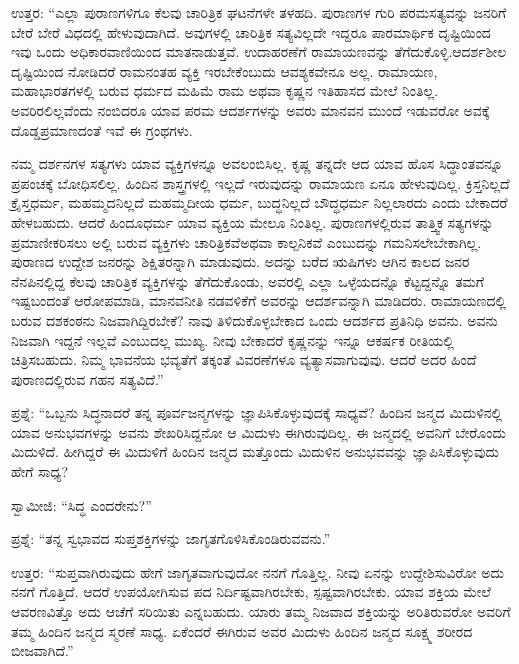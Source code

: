 ಉತ್ತರ: “ಎಲ್ಲಾ ಪುರಾಣಗಳಿಗೂ ಕೆಲವು ಚಾರಿತ್ರಿಕ ಘಟನೆಗಳೇ ತಳಹದಿ. ಪುರಾಣಗಳ ಗುರಿ ಪರಮಸತ್ಯವನ್ನು ಜನರಿಗೆ ಬೇರೆ ಬೇರೆ ವಿಧದಲ್ಲಿ ಹೇಳುವುದಾಗಿದೆ. ಅವುಗಳಲ್ಲಿ ಚಾರಿತ್ರಿಕ ಸತ್ಯವಿಲ್ಲದೇ ಇದ್ದರೂ ಪಾರಮಾರ್ಥಿಕ ದೃಷ್ಟಿಯಿಂದ ಇವು ಒಂದು ಅಧಿಕಾರ\-ವಾಣಿಯಿಂದ ಮಾತನಾಡುತ್ತವೆ. ಉದಾಹರಣೆಗೆ ರಾಮಾಯಣವನ್ನು ತೆಗೆದುಕೊಳ್ಳಿ.\break ಆದರ್ಶಶೀಲ ದೃಷ್ಟಿಯಿಂದ ನೋಡಿದರೆ ರಾಮನಂತಹ ವ್ಯಕ್ತಿ ಇರಬೇಕೆಂಬುದು ಆವಶ್ಯಕವೇನೂ ಅಲ್ಲ. ರಾಮಾಯಣ, ಮಹಾಭಾರತಗಳಲ್ಲಿ ಬರುವ ಧರ್ಮದ ಮಹಿಮೆ ರಾಮ ಅಥವಾ ಕೃಷ್ಣನ ಇತಿಹಾಸದ ಮೇಲೆ ನಿಂತಿಲ್ಲ. ಅವರಿರಲಿಲ್ಲವೆಂದು ನಂಬಿದರೂ ಯಾವ ಪರಮ ಆದರ್ಶಗಳನ್ನು ಅವರು ಮಾನವನ ಮುಂದೆ ಇಡುವರೋ ಅವಕ್ಕೆ ದೊಡ್ಡ\break ಪ್ರಮಾಣದಂತೆ ಇವೆ ಈ ಗ್ರಂಥಗಳು.

ನಮ್ಮ ದರ್ಶನಗಳ ಸತ್ಯಗಳು ಯಾವ ವ್ಯಕ್ತಿಗಳನ್ನೂ ಅವಲಂಬಿಸಿಲ್ಲ. ಕೃಷ್ಣ ತನ್ನದೇ ಆದ ಯಾವ ಹೊಸ ಸಿದ್ಧಾಂತವನ್ನೂ ಪ್ರಪಂಚಕ್ಕೆ ಬೋಧಿಸಲಿಲ್ಲ. ಹಿಂದಿನ ಶಾಸ್ತ್ರಗಳಲ್ಲಿ ಇಲ್ಲದೆ ಇರುವುದನ್ನು ರಾಮಾಯಣ ಏನೂ ಹೇಳುವುದಿಲ್ಲ. ಕ್ರಿಸ್ತನಿಲ್ಲದೆ ಕ್ರೈಸ್ತಧರ್ಮ, ಮಹಮ್ಮದನಿಲ್ಲದೆ ಮಹಮ್ಮದೀಯ ಧರ್ಮ, ಬುದ್ಧನಿಲ್ಲದೆ ಬೌದ್ಧಧರ್ಮ ನಿಲ್ಲಲಾರದು ಎಂದು ಬೇಕಾದರೆ ಹೇಳಬಹುದು. ಆದರೆ ಹಿಂದೂಧರ್ಮ ಯಾವ ವ್ಯಕ್ತಿಯ ಮೇಲೂ ನಿಂತಿಲ್ಲ. ಪುರಾಣಗಳಲ್ಲಿರುವ ತಾತ್ತ್ವಿಕ ಸತ್ಯಗಳನ್ನು ಪ್ರಮಾಣೀಕರಿಸಲು ಅಲ್ಲಿ ಬರುವ ವ್ಯಕ್ತಿಗಳು ಚಾರಿತ್ರಿಕವೆ\break ಅಥವಾ ಕಾಲ್ಪನಿಕವೆ ಎಂಬುದನ್ನು ಗಮನಿಸಲೇಬೇಕಾಗಿಲ್ಲ. ಪುರಾಣದ ಉದ್ದೇಶ ಜನರನ್ನು ಶಿಕ್ಷಿತರನ್ನಾಗಿ ಮಾಡುವುದು. ಅದನ್ನು ಬರೆದ ಋಷಿಗಳು ಆಗಿನ ಕಾಲದ ಜನರ ನೆನಪಿನಲ್ಲಿದ್ದ ಕೆಲವು ಚಾರಿತ್ರಿಕ ವ್ಯಕ್ತಿಗಳನ್ನು ತೆಗೆದುಕೊಂಡು, ಅವರಲ್ಲಿ ಎಲ್ಲಾ ಒಳ್ಳೆಯದನ್ನೊ ಕೆಟ್ಟದ್ದನ್ನೊ ತಮಗೆ ಇಷ್ಟಬಂದಂತೆ ಆರೋಪಮಾಡಿ, ಮಾನವನೀತಿ ನಡವಳಿಕೆಗೆ ಅವರನ್ನು ಆದರ್ಶವನ್ನಾಗಿ ಮಾಡಿದರು. ರಾಮಾಯಣದಲ್ಲಿ ಬರುವ ದಶಕಂಠನು ನಿಜವಾಗಿದ್ದಿರಬೇಕೆ? ನಾವು ತಿಳಿದುಕೊಳ್ಳಬೇಕಾದ ಒಂದು ಆದರ್ಶದ ಪ್ರತಿನಿಧಿ ಅವನು. ಅವನು ನಿಜವಾಗಿ ಇದ್ದನೆ ಇಲ್ಲವೆ ಎಂಬುದಲ್ಲ ಮುಖ್ಯ. ನೀವು ಬೇಕಾದರೆ ಕೃಷ್ಣನನ್ನು ಇನ್ನೂ ಆಕರ್ಷಕ ರೀತಿಯಲ್ಲಿ ಚಿತ್ರಿಸಬಹುದು. ನಿಮ್ಮ ಭಾವನೆಯ ಭವ್ಯತೆಗೆ ತಕ್ಕಂತೆ ವಿವರಣೆಗಳೂ ವ್ಯತ್ಯಾಸವಾಗುವುವು. ಆದರೆ ಅದರ ಹಿಂದೆ ಪುರಾಣದಲ್ಲಿರುವ ಗಹನ ಸತ್ಯವಿದೆ.”

ಪ್ರಶ್ನೆ: “ಒಬ್ಬನು ಸಿದ್ಧನಾದರೆ ತನ್ನ ಪೂರ್ವಜನ್ಮಗಳನ್ನು ಜ್ಞಾಪಿಸಿಕೊಳ್ಳುವುದಕ್ಕೆ ಸಾಧ್ಯವೆ? ಹಿಂದಿನ ಜನ್ಮದ ಮಿದುಳಿನಲ್ಲಿ ಯಾವ ಅನುಭವಗಳನ್ನು ಅವನು ಶೇಖರಿಸಿದ್ದನೋ ಆ ಮಿದುಳು ಈಗಿರುವುದಿಲ್ಲ. ಈ ಜನ್ಮದಲ್ಲಿ ಅವನಿಗೆ ಬೇರೊಂದು ಮಿದುಳಿದೆ. ಹೀಗಿದ್ದರೆ ಈ ಮಿದುಳಿಗೆ ಹಿಂದಿನ ಜನ್ಮದ ಮತ್ತೊಂದು ಮಿದುಳಿನ ಅನುಭವವನ್ನು ಜ್ಞಾಪಿಸಿಕೊಳ್ಳುವುದು ಹೇಗೆ ಸಾಧ್ಯ?

ಸ್ವಾಮೀಜಿ: “ಸಿದ್ಧ ಎಂದರೇನು?”

ಪ್ರಶ್ನೆ: “ತನ್ನ ಸ್ವಭಾವದ ಸುಪ್ತಶಕ್ತಿಗಳನ್ನು ಜಾಗೃತಗೊಳಿಸಿಕೊಂಡಿರುವವನು.”

\vskip 4pt

ಉತ್ತರ: “ಸುಪ್ತವಾಗಿರುವುದು ಹೇಗೆ ಜಾಗೃತವಾಗುವುದೋ ನನಗೆ ಗೊತ್ತಿಲ್ಲ. ನೀವು ಏನನ್ನು ಉದ್ದೇಶಿಸುವಿರೋ ಅದು ನನಗೆ ಗೊತ್ತಿದೆ. ಆದರೆ ಉಪಯೋಗಿಸುವ ಪದ ನಿರ್ದಿಷ್ಟವಾಗಿರಬೇಕು, ಸ್ಪಷ್ಟವಾಗಿರಬೇಕು. ಯಾವ ಶಕ್ತಿಯ ಮೇಲೆ ಆವರಣವಿತ್ತೊ ಅದು ಆಚೆಗೆ ಸರಿಯಿತು ಎನ್ನಬಹುದು. ಯಾರು ತಮ್ಮ ನಿಜವಾದ ಶಕ್ತಿಯನ್ನು ಅರಿತಿರುವರೋ ಅವರಿಗೆ ತಮ್ಮ ಹಿಂದಿನ ಜನ್ಮದ ಸ್ಮರಣೆ ಸಾಧ್ಯ. ಏಕೆಂದರೆ ಈಗಿರುವ ಅವರ ಮಿದುಳು ಹಿಂದಿನ ಜನ್ಮದ ಸೂಕ್ಷ್ಮ ಶರೀರದ ಬೀಜವಾಗಿದೆ.”

\vskip 4pt

